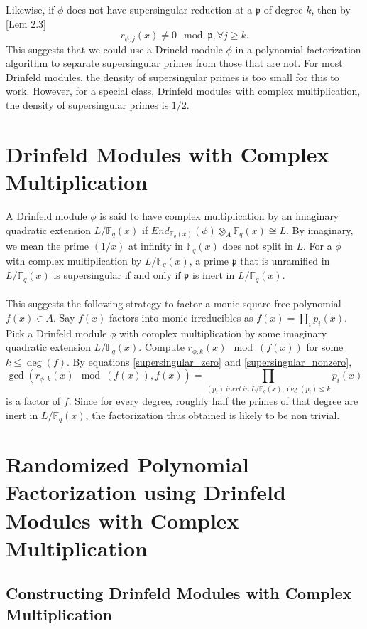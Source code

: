 \documentclass{article}
\theoremstyle{plain}
\theoremstyle{definition}
\def\F{\ensuremath{\mathbb{F}}}
\newcommand{\p}{\mathfrak p}
\begin{document}
Likewise, if $\phi$ does not have supersingular reduction at a $\p$ of degree $k$, then by \cite{cor}[Lem 2.3]
\begin{equation}\label{supersingular_nonzero}
 r_{\phi,j}(x) \neq 0 \mod \p , \forall j \geq k.
\end{equation}
This suggests that we could use a Drineld module $\phi$ in a polynomial factorization algorithm to 
separate supersingular primes from those that are not. For most Drinfeld modules, the density of 
supersingular primes is too small for this to work. However, for a special class, Drinfeld modules 
with complex multiplication, the density of supersingular primes is $1/2$. 


\section{Drinfeld Modules with Complex Multiplication}\label{randomized_section}
A Drinfeld module $\phi$ is said to have complex multiplication by an imaginary quadratic extension $L/\F_q(x)$ if $End_{\F_q(x)}(\phi)\otimes_A \F_q(x) \cong L$. By imaginary, we mean the prime $(1/x)$ at infinity in $\F_q(x)$ does not split in $L$. For a $\phi$ with complex multiplication by $L/\F_q(x)$, a prime $\p$ that is unramified in $L/\F_q(x)$  is supersingular if and only if $\p$ is inert in $L/\F_q(x)$.\\ \\
This suggests the following  strategy to factor a monic square free polynomial $f(x) \in A$. Say 
$f(x)$ factors into monic irreducibles as $f(x) = \prod_i p_i(x)$. Pick a Drinfeld module $\phi$ 
with complex multiplication by some imaginary quadratic extension $L/\F_q(x)$. Compute 
$r_{\phi,k}(x) \mod (f(x))$ for some $k \leq \deg(f)$. By equations \ref{supersingular_zero} and 
\ref{supersingular_nonzero}, $$\gcd(r_{\phi,k}(x) \mod (f(x)), f(x)) = \prod_{(p_i)\ inert\ in\ 
L/\F_q(x), \deg(p_i)\leq k}p_i(x)$$ is a factor of $f$. Since for every degree, roughly half the 
primes of that degree are inert in $L/\F_q(x)$, the factorization  thus obtained is likely to be 
non trivial. 


\section{Randomized Polynomial Factorization using Drinfeld Modules with Complex Multiplication}
\subsection{Constructing Drinfeld Modules with Complex 
Multiplication}\label{drinfeld_construction_subsection}
\end{document}
